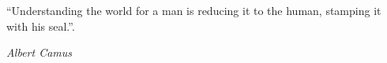 \thispagestyle{empty}

\vspace*{5cm}

\setlength{\epigraphwidth}{0.5\textwidth}

{
\epigraph{\large``Understanding the world for a man is reducing it to the human, stamping it with his seal.''.}{\textit{\large Albert Camus}}
}


